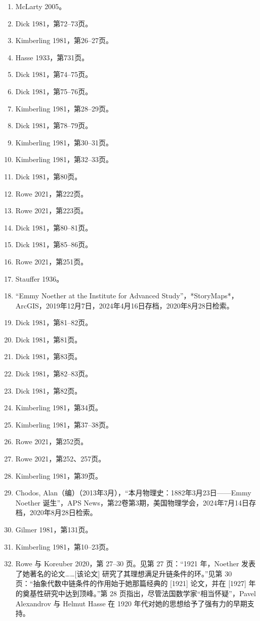 \begin{enumerate}
\item McLarty 2005。
\item Dick 1981，第72–73页。
\item Kimberling 1981，第26–27页。
\item Hasse 1933，第731页。
\item Dick 1981，第74–75页。
\item Dick 1981，第75–76页。
\item Kimberling 1981，第28–29页。
\item Dick 1981，第78–79页。
\item Kimberling 1981，第30–31页。
\item Kimberling 1981，第32–33页。
\item Dick 1981，第80页。
\item Rowe 2021，第222页。
\item Rowe 2021，第223页。
\item Dick 1981，第80–81页。
\item Dick 1981，第85–86页。
\item Rowe 2021，第251页。
\item Stauffer 1936。
\item “Emmy Noether at the Institute for Advanced Study”，*StoryMaps*，ArcGIS，2019年12月7日，2024年4月16日存档，2020年8月28日检索。
\item Dick 1981，第81–82页。
\item Dick 1981，第81页。
\item Dick 1981，第83页。
\item Dick 1981，第82–83页。
\item Dick 1981，第82页。
\item Kimberling 1981，第34页。
\item Kimberling 1981，第37–38页。
\item Rowe 2021，第252页。
\item Rowe 2021，第252、257页。
\item Kimberling 1981，第39页。
\item Chodos, Alan（编）（2013年3月），“本月物理史：1882年3月23日——Emmy Noether 诞生”，APS News，第22卷第3期，美国物理学会，2024年7月14日存档，2020年8月28日检索。
\item Gilmer 1981，第131页。
\item Kimberling 1981，第10–23页。
\item Rowe 与 Koreuber 2020，第 27–30 页。见第 27 页：“1921 年，Noether 发表了她著名的论文……[该论文] 研究了其理想满足升链条件的环。”见第 30 页：“抽象代数中链条件的作用始于她那篇经典的 [1921] 论文，并在 [1927] 年的奠基性研究中达到顶峰。”第 28 页指出，尽管法国数学家“相当怀疑”，Pavel Alexandrov 与 Helmut Hasse 在 1920 年代对她的思想给予了强有力的早期支持。

\end{enumerate}
